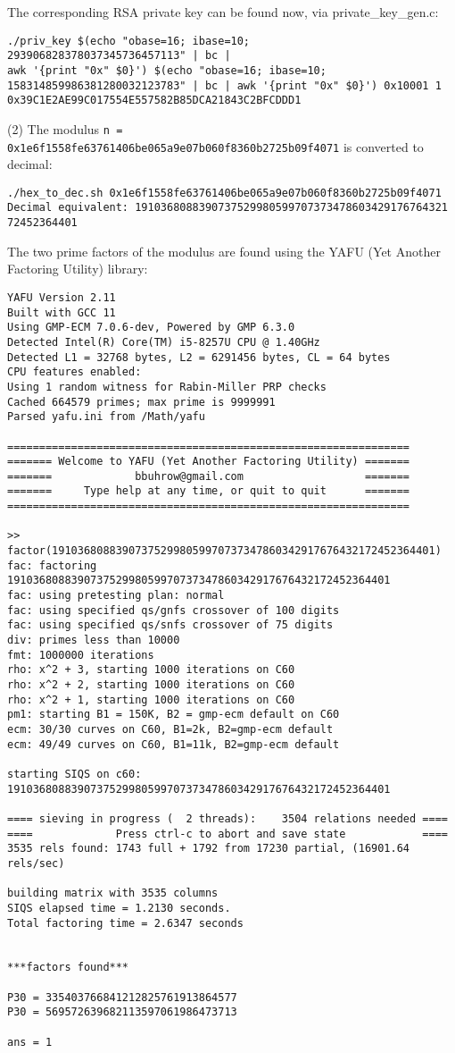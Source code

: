\documentclass[a4paper,11pt]{article}
\theoremstyle{mytheor}
\begin{document}
\noindent The corresponding RSA private key can be found now, via private\_key\_gen.c:
\begin{verbatim}
./priv_key $(echo "obase=16; ibase=10;
293906828378037345736457113" | bc |
awk '{print "0x" $0}') $(echo "obase=16; ibase=10; 
158314859986381280032123783" | bc | awk '{print "0x" $0}') 0x10001 1
0x39C1E2AE99C017554E557582B85DCA21843C2BFCDDD1
\end{verbatim}

\noindent (2) The modulus \texttt{n = 0x1e6f1558fe63761406be065a9e07b060f8360b2725b09f4071} is converted to decimal:

\begin{verbatim}
./hex_to_dec.sh 0x1e6f1558fe63761406be065a9e07b060f8360b2725b09f4071
Decimal equivalent: 1910368088390737529980599707373478603429176764321
72452364401
\end{verbatim}

\noindent The two prime factors of the modulus are found using the YAFU (Yet Another Factoring Utility) library:
\begin{verbatim}
YAFU Version 2.11
Built with GCC 11
Using GMP-ECM 7.0.6-dev, Powered by GMP 6.3.0
Detected Intel(R) Core(TM) i5-8257U CPU @ 1.40GHz
Detected L1 = 32768 bytes, L2 = 6291456 bytes, CL = 64 bytes
CPU features enabled: 
Using 1 random witness for Rabin-Miller PRP checks
Cached 664579 primes; max prime is 9999991
Parsed yafu.ini from /Math/yafu

===============================================================
======= Welcome to YAFU (Yet Another Factoring Utility) =======
=======             bbuhrow@gmail.com                   =======
=======     Type help at any time, or quit to quit      =======
===============================================================

>> factor(191036808839073752998059970737347860342917676432172452364401)
fac: factoring 191036808839073752998059970737347860342917676432172452364401
fac: using pretesting plan: normal
fac: using specified qs/gnfs crossover of 100 digits
fac: using specified qs/snfs crossover of 75 digits
div: primes less than 10000
fmt: 1000000 iterations
rho: x^2 + 3, starting 1000 iterations on C60 
rho: x^2 + 2, starting 1000 iterations on C60 
rho: x^2 + 1, starting 1000 iterations on C60 
pm1: starting B1 = 150K, B2 = gmp-ecm default on C60
ecm: 30/30 curves on C60, B1=2k, B2=gmp-ecm default
ecm: 49/49 curves on C60, B1=11k, B2=gmp-ecm default

starting SIQS on c60: 191036808839073752998059970737347860342917676432172452364401

==== sieving in progress (  2 threads):    3504 relations needed ====
====             Press ctrl-c to abort and save state            ====
3535 rels found: 1743 full + 1792 from 17230 partial, (16901.64 rels/sec)

building matrix with 3535 columns
SIQS elapsed time = 1.2130 seconds.
Total factoring time = 2.6347 seconds


***factors found***

P30 = 335403766841212825761913864577
P30 = 569572639682113597061986473713

ans = 1
\end{verbatim}
\end{document}
